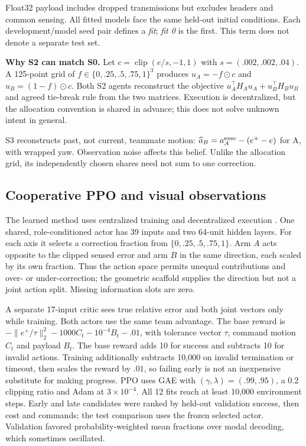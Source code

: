 \documentclass{article}
\begin{document}
Float32 payload includes dropped transmissions but excludes headers and common sensing. All fitted models face the same held-out initial conditions. Each development/model seed pair defines a \emph{fit}; \emph{fit 0} is the first. This term does not denote a separate test set.

\textbf{Why S2 can match S0.} Let $c=\operatorname{clip}(e/s,-1,1)$ with $s=(.002,.002,.04)$. A 125-point grid of $f\in\{0,.25,.5,.75,1\}^3$ produces $u_A=-f\odot c$ and $u_B=(1-f)\odot c$. Both S2 agents reconstruct the objective $u_A^\top H_Au_A+u_B^\top H_Bu_B$ and agreed tie-break rule from the two matrices. Execution is decentralized, but the allocation convention is shared in advance; this does not solve unknown intent in general.

S3 reconstructs past, not current, teammate motion: $\widehat a_B=a_A^{\rm exec}-(e^+-e)$ for A, with wrapped yaw. Observation noise affects this belief. Unlike the allocation grid, its independently chosen shares need not sum to one correction.

\clearpage
\subsection{Cooperative PPO and visual observations}
The learned method uses centralized training and decentralized execution \cite{ppo,mappo}. One shared, role-conditioned actor has 39 inputs and two 64-unit hidden layers. For each axis it selects a correction fraction from $\{0,.25,.5,.75,1\}$. Arm $A$ acts opposite to the clipped sensed error and arm $B$ in the same direction, each scaled by its own fraction. Thus the action space permits unequal contributions and over- or under-correction; the geometric scaffold supplies the direction but not a joint action split. Missing information slots are zero.

A separate 17-input critic sees true relative error and both joint vectors only while training. Both actors use the same team advantage. The base reward is $-\|e^+/\tau\|_2^2-1000 C_t-10^{-4}B_t-.01$, with tolerance vector $\tau$, command motion $C_t$ and payload $B_t$. The base reward adds 10 for success and subtracts 10 for invalid actions. Training additionally subtracts 10,000 on invalid termination or timeout, then scales the reward by $.01$, so failing early is not an inexpensive substitute for making progress. PPO uses GAE with $(\gamma,\lambda)=(.99,.95)$, a 0.2 clipping ratio and Adam at $3\times10^{-4}$. All 12 fits reach at least 10,000 environment steps. Early and late candidates were ranked by held-out validation success, then cost and commands; the test comparison uses the frozen selected actor. Validation favored probability-weighted mean fractions over modal decoding, which sometimes oscillated.
\end{document}
